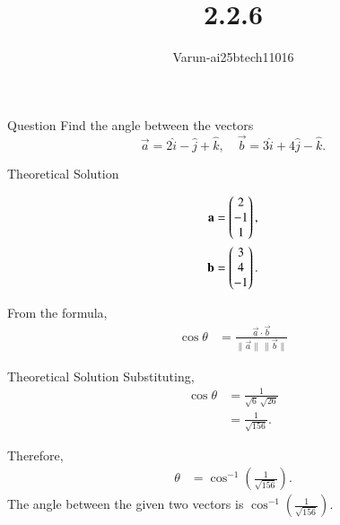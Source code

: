 \documentclass{beamer}
\title %
{2.2.6}
\author %
{Varun-ai25btech11016}
\begin{document}
\frame{\titlepage}
\begin{frame}{Question}
  Find the angle between the vectors 
$$
\vec{a} = 2\hat{i} - \hat{j} + \hat{k}, \quad \vec{b} = 3\hat{i} + 4\hat{j} - \hat{k}.
$$

\end{frame}



\begin{frame}{Theoretical Solution }

 \begin{align}
\mathbf{a} &= \begin{pmatrix}2 \\ -1 \\ 1\end{pmatrix}, \\
\mathbf{b} &= \begin{pmatrix}3 \\ 4 \\ -1\end{pmatrix}.
\end{align}

From the formula,
\begin{align}
\cos \theta &= \frac{\vec{a} \cdot \vec{b}}{\lVert \vec{a} \rVert \, \lVert \vec{b} \rVert}
\end{align}
\end{frame}
\begin{frame}{Theoretical Solution }
Substituting,
\begin{align}
\cos \theta &= \frac{1}{\sqrt{6}\,\sqrt{26}} \\
&= \frac{1}{\sqrt{156}}. \nonumber
\end{align}

Therefore,
\begin{align}
\theta &= \cos^{-1}\left(\frac{1}{\sqrt{156}}\right).
\end{align}
The angle between the given two vectors is $\cos^{-1}\left(\frac{1}{\sqrt{156}}\right).$
\end{frame}
\end{document}
